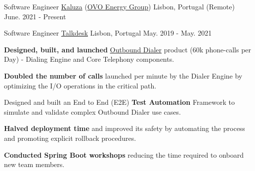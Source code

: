 
\begin{cventries}
  \vspace{-2mm}
  \cventry
    {Software Engineer}
    {\href{https://www.kaluza.com/}{Kaluza} (\href{https://www.ovoenergy.com/}{OVO Energy Group})}
    {Lisbon, Portugal (Remote)}
    {June. 2021 - Present}
    {
    }

  \cventry
    {Software Engineer}
    {\href{https://www.talkdesk.com/}{Talkdesk}}
    {Lisbon, Portugal}
    {May. 2019 - May. 2021}
    {
      \begin{cvitems}
        \item \textbf{Designed, built, and launched} \href{https://www.youtube.com/watch?v=W9yJ6gi1ggA}{Outbound Dialer} product (60k phone-calls per Day) - Dialing Engine and Core Telephony components.
        \item \textbf{Doubled the number of calls} launched per minute by the Dialer Engine by optimizing the I/O operations in the critical path.
        \item Designed and built an End to End (E2E) \textbf{Test Automation} Framework to simulate and validate complex Outbound Dialer use cases.
        \item \textbf{Halved deployment time} and improved its safety by automating the process and promoting explicit rollback procedures.
        \item \textbf{Conducted Spring Boot workshops} reducing the time required to onboard new team members.
      \end{cvitems}
      \vspace{4mm}
    }
    

\end{cventries}
